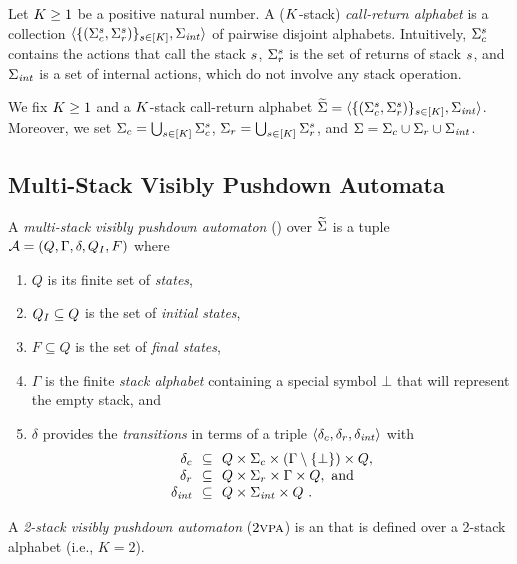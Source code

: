 \documentclass{LMCS}
\begin{document}
Let $K \ge 1$ be a positive natural number. A ($K$-stack)
\emph{call-return alphabet} is a collection
$\langle\{(\Sigma_c^s,\Sigma_r^s)\}_{s \in
  [K]},\Sigma_{\mathit{int}}\rangle$ of pairwise disjoint alphabets.
Intuitively, $\Sigma_c^s$ contains the actions that call the stack
$s$, $\Sigma_r^s$ is the set of returns of stack $s$, and
$\Sigma_{\mathit{int}}$ is a set of internal actions, which do not involve any stack
operation.

We fix $K \ge 1$ and a $K$-stack call-return alphabet
$\widetilde{\Sigma}=\langle\{(\Sigma_c^s,\Sigma_r^s)\}_{s \in
  [K]},\Sigma_{\mathit{int}}\rangle$. Moreover, we set $\Sigma_c = \bigcup_{s
  \in [K]} \Sigma_c^s$, $\Sigma_r = \bigcup_{s \in [K]}
\Sigma_r^s$, and $\Sigma = \Sigma_c \cup \Sigma_r \cup \Sigma_{\mathit{int}}$.

\subsection{Multi-Stack Visibly Pushdown Automata}

\begin{defi}
  A \emph{multi-stack visibly pushdown automaton} (\MVPA) over $\widetilde{\Sigma}$ is a
  tuple $\mathcal{A}=(Q,\Gamma,\delta,Q_I,F)$ where
\begin{enumerate}[$\bullet$]
\item $Q$ is its finite set of \emph{states},
\item $Q_I \subseteq Q$ is the set of \emph{initial states},
\item $F \subseteq Q$ is the set of \emph{final states},
\item $\Gamma$ is the finite \emph{stack alphabet} containing a special symbol
  $\bot$ that will represent the empty stack, and
\item $\delta$ provides the \emph{transitions} in terms of a triple $\langle\delta_c,\delta_r,\delta_{\mathit{int}}\rangle$
  with
\[\begin{array}{rcl}
  \cdelta & \!\!\mathrel{\subseteq}\!\! & Q \times \cSigma \times (\Gamma \setminus
  \{\bot\}) \times Q,\\ \rdelta & \!\!\mathrel{\subseteq}\!\! & Q \times \rSigma \times
  \Gamma \times Q,~\text{and}\\ \intdelta & \!\!\mathrel{\subseteq}\!\! & Q \times
  \intSigma \times Q~.\end{array}\]
\end{enumerate}

A \emph{2-stack visibly pushdown automaton} ($2\textsc{vpa}$) is an \MVPA that is
defined over a 2-stack alphabet (i.e., $K=2$).
\end{defi}
\end{document}
